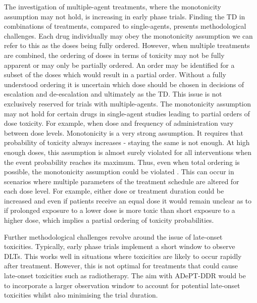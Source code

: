 The investigation of multiple-agent treatments, where the monotonicity assumption may not hold, is increasing in early phase trials. Finding the TD in combinations of treatments, compared to single-agents,  presents methodological challenges. Each drug individually may obey the monotonicity assumption we can refer to this as the doses being fully ordered. However, when multiple treatments are combined, the ordering of doses in terms of toxicity may not be fully apparent or may only be partially ordered. An order may be identified for a subset of the doses which would result in a partial order. Without a fully understood ordering it is uncertain which dose should be chosen in decisions of escalation and de-escalation and ultimately as the TD. This issue is not exclusively reserved for trials with multiple-agents. The monotonicity assumption may not hold for certain drugs in single-agent studies leading to partial orders of dose toxicity. For example, when dose and frequency of administration vary between dose levels. Monotonicity is a very strong assumption. It requires that probability of toxicity always increases - staying the same is not enough. At high enough doses, this assumption is almost surely violated for all interventions when the event probability reaches its maximum. Thus, even when total ordering is possible, the monotonicity assumption could be violated \cite{brockMoreBetterAnalysis2020}. This can occur in scenarios where multiple parameters of the treatment schedule are altered for each dose level. For example, either dose or treatment duration could be increased and even if patients receive an equal dose it would remain unclear as to if prolonged exposure to a lower dose is more toxic than short exposure to a higher dose, which implies a partial ordering of toxicity probabilities. 

Further methodological challenges revolve around the issue of late-onset toxicities. Typically, early phase trials implement a short window to observe DLTs. This works well in situations where toxicities are likely to occur rapidly after treatment. However, this is not optimal for treatments that could cause late-onset toxicities such as radiotherapy. The aim with ADePT-DDR would be to incorporate a larger observation window to account for potential late-onset toxicities whilst also minimising the trial duration. 

